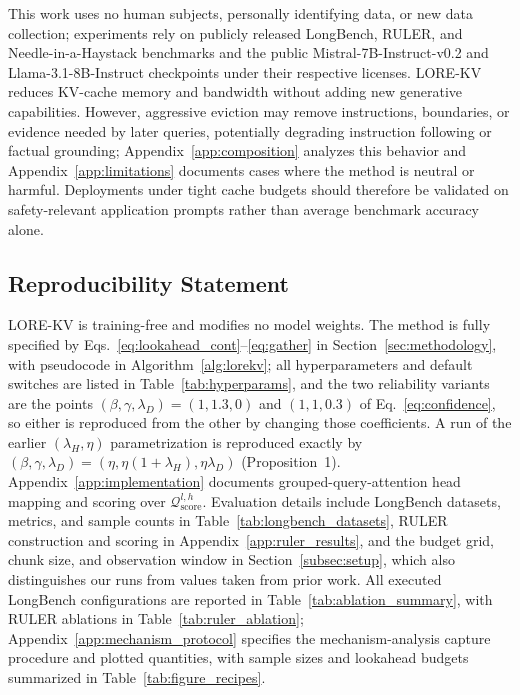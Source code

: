\documentclass{article} %
\begin{document}
This work uses no human subjects, personally identifying data, or new data collection; experiments rely on publicly released LongBench, RULER, and Needle-in-a-Haystack benchmarks and the public Mistral-7B-Instruct-v0.2 and Llama-3.1-8B-Instruct checkpoints under their respective licenses. LORE-KV reduces KV-cache memory and bandwidth without adding new generative capabilities. However, aggressive eviction may remove instructions, boundaries, or evidence needed by later queries, potentially degrading instruction following or factual grounding; Appendix~\ref{app:composition} analyzes this behavior and Appendix~\ref{app:limitations} documents cases where the method is neutral or harmful. Deployments under tight cache budgets should therefore be validated on safety-relevant application prompts rather than average benchmark accuracy alone.

\subsection*{Reproducibility Statement}

LORE-KV is training-free and modifies no model weights. The method is fully specified by Eqs.~\eqref{eq:lookahead_cont}--\eqref{eq:gather} in Section~\ref{sec:methodology}, with pseudocode in Algorithm~\ref{alg:lorekv}; all hyperparameters and default switches are listed in Table~\ref{tab:hyperparams}, and the two reliability variants are the points $(\beta,\gamma,\lambda_D)=(1,1.3,0)$ and $(1,1,0.3)$ of Eq.~\eqref{eq:confidence}, so either is reproduced from the other by changing those coefficients. A run of the earlier $(\lambda_H,\eta)$ parametrization is reproduced exactly by $(\beta,\gamma,\lambda_D)=(\eta,\eta(1+\lambda_H),\eta\lambda_D)$ (Proposition~1). Appendix~\ref{app:implementation} documents grouped-query-attention head mapping and scoring over $\mathcal{Q}^{l,h}_{\mathrm{score}}$. Evaluation details include LongBench datasets, metrics, and sample counts in Table~\ref{tab:longbench_datasets}, RULER construction and scoring in Appendix~\ref{app:ruler_results}, and the budget grid, chunk size, and observation window in Section~\ref{subsec:setup}, which also distinguishes our runs from values taken from prior work. All executed LongBench configurations are reported in Table~\ref{tab:ablation_summary}, with RULER ablations in Table~\ref{tab:ruler_ablation}; Appendix~\ref{app:mechanism_protocol} specifies the mechanism-analysis capture procedure and plotted quantities, with sample sizes and lookahead budgets summarized in Table~\ref{tab:figure_recipes}.
\end{document}
